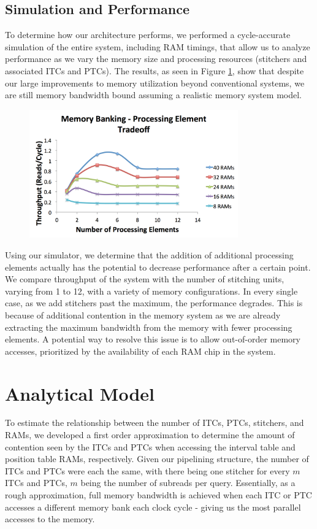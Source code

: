 \documentclass[11pt]{article}
\begin{document}
\subsection{Simulation and Performance}
To determine how our architecture performs, we performed a cycle-accurate simulation of the entire system, including RAM timings, that allow us to analyze performance as we vary the memory size and processing resources (stitchers and associated ITCs and PTCs).  The results, as seen in Figure \ref{utilization}, show that despite our large improvements to memory utilization beyond conventional systems, we are still memory bandwidth bound assuming a realistic memory system model.  
\begin{figure}[ht!]
\centering
\includegraphics[width=90mm]{memproc.png}
\caption{}
\label{utilization}
\end{figure}

Using our simulator, we determine that the addition of additional processing elements actually has the potential to decrease performance after a certain point.  We compare throughput of the system with the number of stitching units, varying from 1 to 12, with a variety of memory configurations.  In every single case, as we add stitchers past the maximum, the performance degrades.  This is because of additional contention in the memory system as we are already extracting the maximum bandwidth from the memory with fewer processing elements.  A potential way to resolve this issue is to allow out-of-order memory accesses, prioritized by the availability of each RAM chip in the system.  

\section{Analytical Model}
 
To estimate the relationship between the number of ITCs, PTCs, stitchers, and RAMs, we developed a first order approximation to determine the amount of contention seen by the ITCs and PTCs when accessing the interval table and position table RAMs, respectively. Given our pipelining structure, the number of ITCs and PTCs were each the same, with there being one stitcher for every $m$ ITCs and PTCs, $m$ being the number of subreads per query. Essentially, as a rough approximation, full memory bandwidth is achieved when each ITC or PTC accesses a different memory bank each clock cycle - giving us the most parallel accesses to the memory.
 
\end{document}
